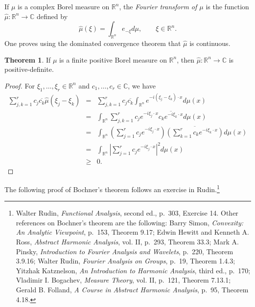 \documentclass{article}
\theoremstyle{definition}
\newtheorem{theorem}{Theorem}
\theoremstyle{definition}
\begin{document}
If $\mu$ is a complex Borel measure on $\mathbb{R}^n$, the {\em Fourier transform of $\mu$} is the function
$\hat{\mu}:\mathbb{R}^n \to \mathbb{C}$ defined by
\[
\hat{\mu}(\xi) = \int_{\mathbb{R}^n} e_{-\xi} d\mu, \qquad \xi \in \mathbb{R}^n.
\]
One proves using the dominated convergence theorem that $\hat{\mu}$ is continuous.

\begin{theorem}
If $\mu$ is a finite positive Borel measure on $\mathbb{R}^n$, then $\hat{\mu}:\mathbb{R}^n \to \mathbb{C}$ is positive-definite.
\end{theorem}
\begin{proof}
For $\xi_1,\ldots,\xi_r \in \mathbb{R}^n$ and $c_1,\ldots,c_r \in \mathbb{C}$, we have
\begin{eqnarray*}
\sum_{j,k=1}^r c_j \overline{c_k} \hat{\mu}(\xi_j-\xi_k)&=&\sum_{j,k=1}^r c_j \overline{c_k} \int_{\mathbb{R}^n}
e^{-i(\xi_j-\xi_k)\cdot x} d\mu(x)\\
&=&\int_{\mathbb{R}^n} \sum_{j,k=1}^r c_j e^{-i\xi_j\cdot x} \overline{c_k e^{-i \xi_k \cdot x}} d\mu(x)\\
&=&\int_{\mathbb{R}^n} \left( \sum_{j=1}^r c_j e^{-i\xi_j\cdot x} \right)
\overline{\left( \sum_{k=1}^r c_k e^{-i\xi_k\cdot x} \right)}
 d\mu(x)\\
 &=&\int_{\mathbb{R}^n} \left| \sum_{j=1}^r c_j e^{-i\xi_j\cdot x} \right|^2 d\mu(x)\\
 &\geq&0.
\end{eqnarray*}
\end{proof}




The following proof of Bochner's theorem follows an exercise in Rudin.\footnote{Walter Rudin, {\em Functional Analysis}, second ed., p.~303, Exercise 14.
Other references on Bochner's theorem are the following:  Barry Simon, {\em Convexity: An Analytic Viewpoint}, p.~153, Theorem 9.17;
Edwin Hewitt and Kenneth A. Ross, {\em Abstract Harmonic Analysis}, vol. II, p.~293, Theorem 33.3; 
Mark A. Pinsky, {\em Introduction to Fourier Analysis and Wavelets}, p.~220, Theorem 3.9.16; Walter Rudin, {\em Fourier Analysis on Groups}, p.~19, Theorem 1.4.3;
Yitzhak Katznelson, {\em An Introduction to Harmonic Analysis}, third ed., p.~170; Vladimir I. Bogachev, {\em Measure Theory},
vol. II, p.~121, Theorem 7.13.1; Gerald B. Folland, {\em A Course in Abstract Harmonic Analysis}, p.~95,
Theorem 4.18.}
\end{document}
